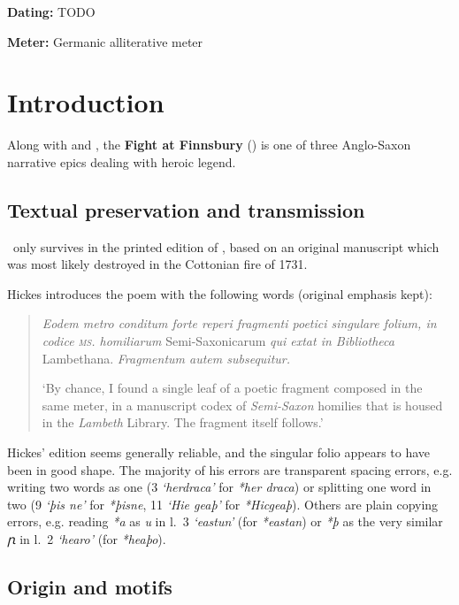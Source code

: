 
\begin{flushright}%
\textbf{Dating:} TODO

\textbf{Meter:} Germanic alliterative meter
\end{flushright}%

\section{Introduction}

Along with  and \Beowulf, the \textbf{Fight at Finnsbury} (\Finnsburg) is one of three Anglo-Saxon narrative epics dealing with heroic legend.

\subsection{Textual preservation and transmission}

\Finnsburg\ only survives in the printed edition of \textcite[\nopp vol. 1, pp. 192--3]{Hickes1703}, based on an original manuscript which was most likely destroyed in the Cottonian fire of 1731.

Hickes introduces the poem with the following words (original emphasis kept):

\begin{quote}
  \emph{Eodem metro conditum forte reperi fragmenti poetici singulare folium, in codice \textsc{ms.} homiliarum} Semi-Saxonicarum \emph{qui extat in Bibliotheca} Lambethana. \emph{Fragmentum autem subsequitur.}

  ‘By chance, I found a single leaf of a poetic fragment composed in the same meter, in a manuscript codex of \emph{Semi-Saxon} homilies that is housed in the \emph{Lambeth} Library. The fragment itself follows.’
\end{quote}

Hickes’ edition seems generally reliable, and the singular folio appears to have been in good shape.  The majority of his errors are transparent spacing errors, e.g. writing two words as one (3 \emph{‘herdraca’} for \emph{*her draca}) or splitting one word in two (9 \emph{‘þis ne’} for \emph{*þisne}, 11 \emph{‘Hie geaþ’} for \emph{*Hicgeaþ}).  Others are plain copying errors, e.g. reading \emph{*a} as \emph{u} in l.~3 \emph{‘eastun’} (for \emph{*eastan}) or \emph{*þ} as the very similar \emph{ꞃ} in l.~2 \emph{‘hearo’} (for \emph{*heaþo}).

\subsection{Origin and motifs}


